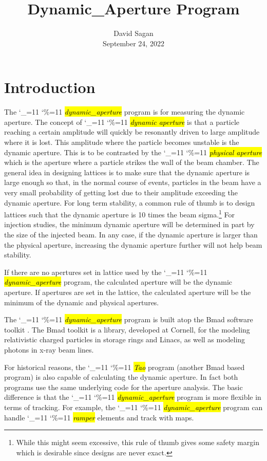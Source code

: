 \documentclass{hitec}
\title{Dynamic_Aperture Program}
\author{}
\date{David Sagan \\ September 24, 2022}
\newcommand\dottcmd[1]{\hl{\em#1}\endgroup}
\newcommand{\vn}{\begingroup\catcode`\_=11 \catcode`\%=11 \dottcmd}
\newcommand{\da}{\vn{dynamic_aperture}\xspace}
\newcommand{\Section}[1]{\section{#1}\vspace*{-1ex}}
\begin{document}

\maketitle

\tableofcontents

\Section{Introduction} 
\label{s:intro}

The \da program is for measuring the dynamic aperture. The concept of \vn{dynamic aperture} is that
a particle reaching a certain amplitude will quickly be resonantly driven to large amplitude where
it is lost. This amplitude where the particle becomes unstable is the dynamic aperture. This is to
be contrasted by the \vn{physical aperture} which is the aperture where a particle strikes the wall
of the beam chamber. The general idea in designing lattices is to make sure that the dynamic
aperture is large enough so that, in the normal course of events, particles in the beam have a very
small probability of getting lost due to their amplitude exceeding the dynamic aperture. For long
term stability, a common rule of thumb is to design lattices such that the dynamic aperture is 10 times
the beam sigma.\footnote
  {
While this might seem excessive, this rule of thumb gives some safety margin which is desirable
since designs are never exact.
  }
For injection studies, the minimum dynamic aperture will be determined in part by the size of the
injected beam. In any case, if the dynamic aperture is larger than the physical aperture, increasing
the dynamic aperture further will not help beam stability. 

If there are no apertures set in lattice used by the \da program, the calculated aperture will be the
dynamic aperture. If apertures are set in the lattice, the calculated aperture will be the minimum of
the dynamic and physical apertures.

The \da program is built atop the Bmad software toolkit \cite{b:bmad}. The Bmad toolkit is a
library, developed at Cornell, for the modeling relativistic charged particles in storage rings and
Linacs, as well as modeling photons in x-ray beam lines.

For historical reasons, the \vn{Tao} program (another Bmad based program) is also capable of
calculating the dynamic aperture. 
In fact both programs use the same underlying code for the
aperture analysis. The basic difference is that the \da program is more flexible in terms
of tracking. For example, the \da program can handle \vn{ramper} elements and track with maps.
\end{document}
